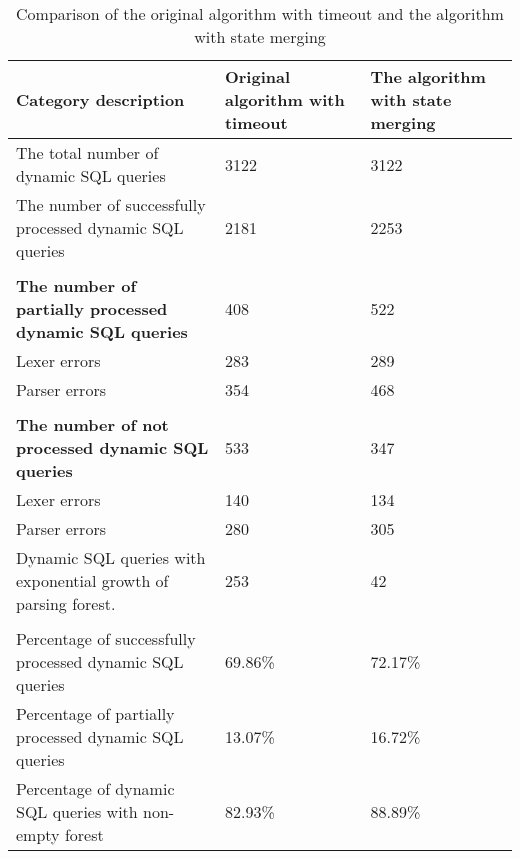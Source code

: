 \begin{table}
\begin{center}

\caption{Comparison of the original algorithm with timeout and the algorithm with state merging}
\begin{tabular}[c c c]{| p{5cm} | p{1.1cm} | p{1.1cm} |}
\hline
Category description & Original algorithm with timeout & The algorithm with state merging
\\
\hline
The total number of dynamic SQL queries & 3122 & 3122
\\
\hline
The number of successfully processed dynamic SQL queries & 2181 & 2253
\\
\hline
 & &
\\
\hline
\bfseries{The number of partially processed dynamic SQL queries} & 408 & 522
\\
\hline

 Lexer errors & 283 & 289
\\
\hline

 Parser errors & 354 & 468
\\
\hline
 & &
\\
\hline

\bfseries{The number of not processed dynamic SQL queries} & 533 & 347
\\
\hline
  Lexer errors & 140 & 134
\\
\hline

 Parser errors & 280 & 305
\\
\hline

 Dynamic SQL queries with exponential growth of parsing forest. & 253 & 42

\\
\hline
 & &
\\
\hline


Percentage of successfully processed dynamic SQL queries & 69.86\% & 72.17\%
\\
\hline

Percentage of partially processed dynamic SQL queries & 13.07\% & 16.72\%
\\
\hline

Percentage of dynamic SQL queries with non-empty forest & 82.93\% & 88.89\%
\\
\hline
 
\end{tabular}
\label{results}
\end{center}

\end{table}

